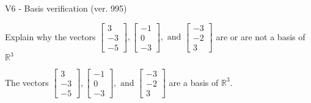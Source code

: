 \begin{exercise}
  \begin{exerciseTitle}V6 - Basis verification (ver. 995)\end{exerciseTitle}
  \begin{exerciseStatement}
    Explain why the vectors \(\left[\begin{array}{r}
3 \\
-3 \\
-5
\end{array}\right] , \left[\begin{array}{r}
-1 \\
0 \\
-3
\end{array}\right] , \text{ and } \left[\begin{array}{r}
-3 \\
-2 \\
3
\end{array}\right]\) are or are not a basis of \(\mathbb{R}^3\)	


  \end{exerciseStatement}
  \begin{exerciseAnswer}
   The vectors \(\left[\begin{array}{r}
3 \\
-3 \\
-5
\end{array}\right] , \left[\begin{array}{r}
-1 \\
0 \\
-3
\end{array}\right] , \text{ and } \left[\begin{array}{r}
-3 \\
-2 \\
3
\end{array}\right]\) 
  	 are  a basis of \(\mathbb{R}^3\).
  


  \end{exerciseAnswer}
\end{exercise}